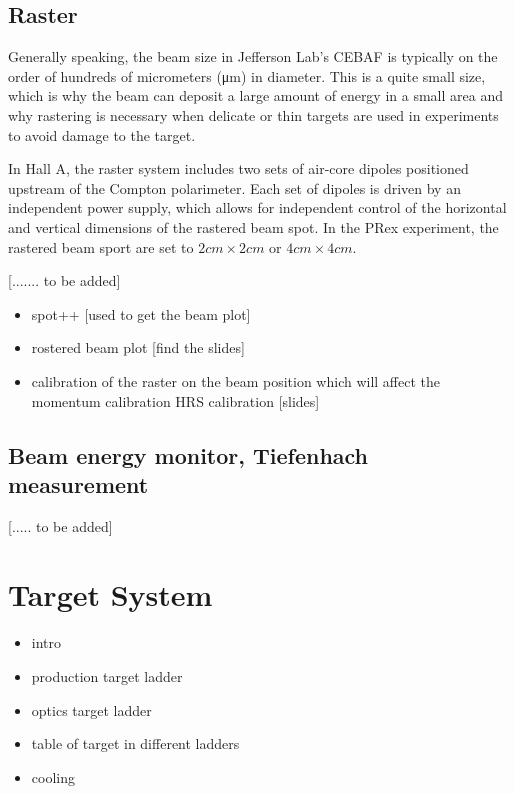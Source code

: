 \subsection{Raster}

Generally speaking, the beam size in Jefferson Lab's CEBAF is typically on the order of hundreds of micrometers (μm) in diameter. This is a quite small size, which is why the beam can deposit a large amount of energy in a small area and why rastering is necessary when delicate or thin targets are used in experiments to avoid damage to the target.

In Hall A, the raster system includes two sets of air-core dipoles positioned upstream of the Compton polarimeter. Each set of dipoles is driven by an independent power supply, which allows for independent control of the horizontal and vertical dimensions of the rastered beam spot. In the PRex experiment, the rastered beam sport are set to $2cm \times 2 cm$ or $4cm \times 4cm$.

[....... to be added]

\begin{itemize}
    \item spot++ [used to get the beam plot]
    \item rostered beam plot [find the slides]
    \item calibration of the raster on the beam position which will affect the momentum calibration HRS calibration [slides]
\end{itemize}

\subsection{Beam energy monitor, Tiefenhach measurement}

[..... to be added]

\section{Target System}

\begin{itemize}
    \item intro
    \item production target ladder 
    \item optics target ladder
    \item table of target in different ladders
    \item cooling
\end{itemize}

